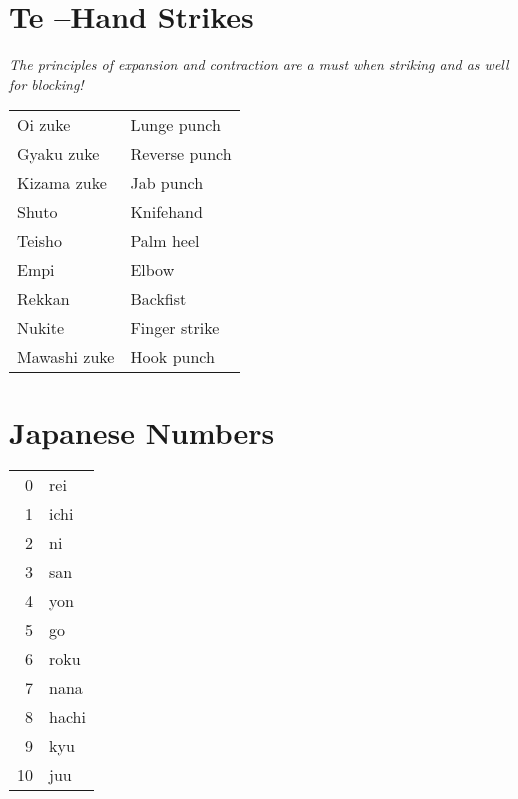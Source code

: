 \documentclass[11pt]{article}
\begin{document}
\section{Te --Hand Strikes}
\label{sec:orgc2395a0}
\begin{center}
\emph{The principles of expansion and contraction are a must when striking and as well for blocking!}
\end{center}

\begin{center}
\begin{tabular}{ll}
Oi zuke & Lunge punch\\
Gyaku zuke & Reverse punch\\
Kizama zuke & Jab punch\\
Shuto & Knifehand\\
Teisho & Palm heel\\
Empi & Elbow\\
Rekkan & Backfist\\
Nukite & Finger strike\\
Mawashi zuke & Hook punch\\
\end{tabular}
\end{center}

\section{Japanese Numbers}
\label{sec:org0affc43}
\begin{center}
\begin{tabular}{rl}
0 & rei\\
1 & ichi\\
2 & ni\\
3 & san\\
4 & yon\\
5 & go\\
6 & roku\\
7 & nana\\
8 & hachi\\
9 & kyu\\
10 & juu\\
\end{tabular}
\end{center}

\newpage
\end{document}
